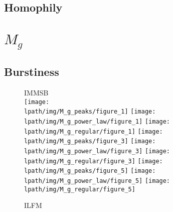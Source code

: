 \documentclass[a4paper, 12pt]{article}
\begin{document}
\clearpage

\subsection{Homophily}

\clearpage
\section{$M_g$}

\subsection{Burstiness}


\begin{figure}[ht]
    \vspace{-3cm}
	\centering IMMSB\\
	\texttt{[image: \\lpath/img/M\_g\_peaks/figure\_1]}
	\endminipage
	\texttt{[image: \\lpath/img/M\_g\_power\_law/figure\_1]}
	\endminipage
	\texttt{[image: \\lpath/img/M\_g\_regular/figure\_1]}
	\endminipage
		\vspace{-0.29cm}
	\texttt{[image: \\lpath/img/M\_g\_peaks/figure\_3]}
	\endminipage
	\texttt{[image: \\lpath/img/M\_g\_power\_law/figure\_3]} 
	\endminipage
	\texttt{[image: \\lpath/img/M\_g\_regular/figure\_3]}
	\endminipage
		\vspace{-0.28cm}
	\texttt{[image: \\lpath/img/M\_g\_peaks/figure\_5]}
	\endminipage
	\texttt{[image: \\lpath/img/M\_g\_power\_law/figure\_5]} 
	\endminipage
	\texttt{[image: \\lpath/img/M\_g\_regular/figure\_5]}
	\endminipage

    \vspace{0.2cm}
	 ILFM


\end{figure}
\end{document}
